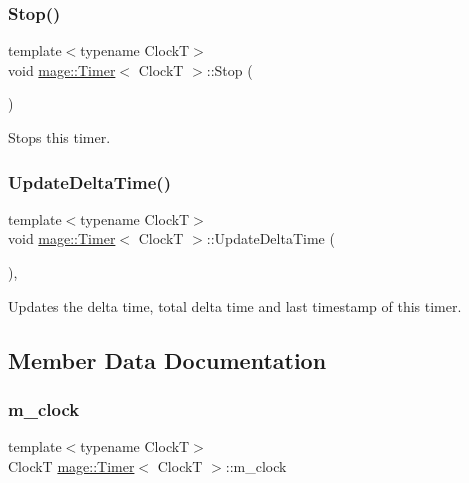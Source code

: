\subsubsection{\texorpdfstring{Stop()}{Stop()}}
{\footnotesize\ttfamily template$<$typename ClockT$>$ \\
void \mbox{\hyperlink{classmage_1_1_timer}{mage\+::\+Timer}}$<$ ClockT $>$\+::Stop (\begin{DoxyParamCaption}{ }\end{DoxyParamCaption})\hspace{0.3cm}{\ttfamily [noexcept]}}

Stops this timer. \mbox{\label{classmage_1_1_timer_a496453325487b638f5959daa24719a2b}} 
\subsubsection{\texorpdfstring{Update\+Delta\+Time()}{UpdateDeltaTime()}}
{\footnotesize\ttfamily template$<$typename ClockT$>$ \\
void \mbox{\hyperlink{classmage_1_1_timer}{mage\+::\+Timer}}$<$ ClockT $>$\+::Update\+Delta\+Time (\begin{DoxyParamCaption}{ }\end{DoxyParamCaption})\hspace{0.3cm}{\ttfamily [private]}, {\ttfamily [noexcept]}}

Updates the delta time, total delta time and last timestamp of this timer. 

\subsection{Member Data Documentation}
\mbox{\label{classmage_1_1_timer_ad46016090f9ae8a282398d8fcc8e9e0e}} 
\subsubsection{\texorpdfstring{m\+\_\+clock}{m\_clock}}
{\footnotesize\ttfamily template$<$typename ClockT$>$ \\
ClockT \mbox{\hyperlink{classmage_1_1_timer}{mage\+::\+Timer}}$<$ ClockT $>$\+::m\+\_\+clock\hspace{0.3cm}{\ttfamily [private]}}


